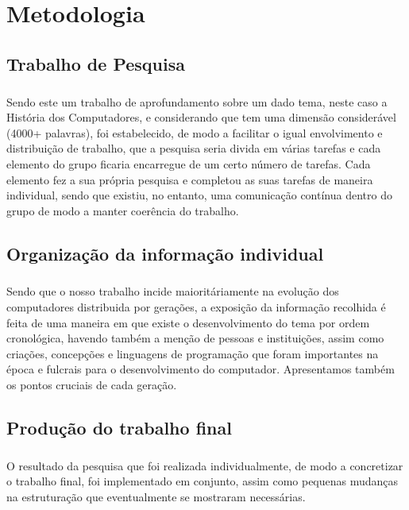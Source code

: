 \documentclass{report}
\begin{document}
\chapter{Metodologia}
\label{chap.metodologia}
\section{Trabalho de Pesquisa}
\paragraph{}
Sendo este um trabalho de aprofundamento sobre um dado tema, neste caso a História dos Computadores, e considerando que tem uma dimensão considerável (4000+ palavras), foi estabelecido, de modo a facilitar o igual envolvimento e distribuição de trabalho, que a pesquisa seria divida em várias tarefas e cada elemento do grupo ficaria encarregue de um certo número de tarefas. Cada elemento fez a sua própria pesquisa e completou as suas tarefas de maneira individual, sendo que existiu, no entanto, uma comunicação contínua dentro do grupo de modo a manter coerência do trabalho.
\section{Organização da informação individual}
\paragraph{}
Sendo que o nosso trabalho incide maioritáriamente na evolução dos computadores distribuida por gerações, a exposição da informação recolhida é feita de uma maneira em que existe o desenvolvimento do tema por ordem cronológica, havendo também a menção de pessoas e instituições, assim como criações, concepções e linguagens de programação que foram importantes na época e fulcrais para o desenvolvimento do computador. Apresentamos também os pontos cruciais de cada geração.
\section{Produção do trabalho final}
\paragraph{}
O resultado da pesquisa que foi realizada individualmente, de modo a concretizar o trabalho final, foi implementado em conjunto, assim como pequenas mudanças na estruturação que eventualmente se mostraram necessárias.
\end{document}

